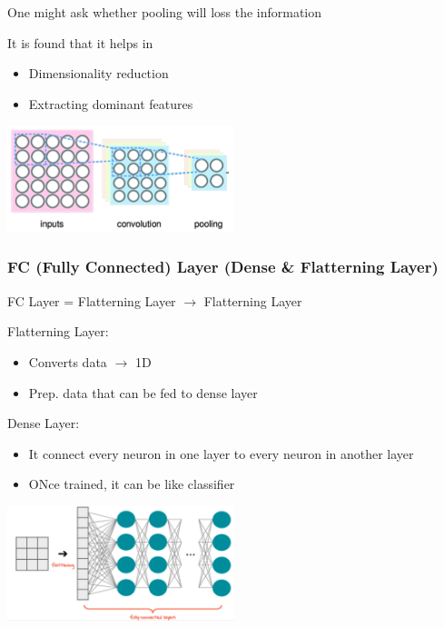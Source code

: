 \documentclass{tron}
\begin{document}
\begin{remark}[Effects]{}
	One might ask whether pooling will loss the information
	
	It is found that it helps in 
\end{remark}

\begin{remark}[Objectives]{}
\begin{itemize}
	\item Dimensionality reduction
	\item Extracting dominant features
\end{itemize}
	\includegraphics[width=250px]{Figs/CNN/pooling-2}
\end{remark}

\clearpage
\subsubsection{FC (Fully Connected) Layer (Dense \& Flatterning Layer)}
\begin{remark}{}
FC Layer = Flatterning Layer $\rightarrow$ Flatterning Layer

Flatterning Layer:
	\begin{itemize}
		\item Converts data $\rightarrow$ 1D
		\item Prep. data that can be fed to dense layer
	\end{itemize}
	
Dense Layer:
	\begin{itemize}
		\item It connect every neuron in one layer to every neuron in another layer
		\item ONce trained, it can be like classifier
	\end{itemize}
	\includegraphics[width=250px]{Figs/CNN/fc}
\end{remark}
\end{document}
